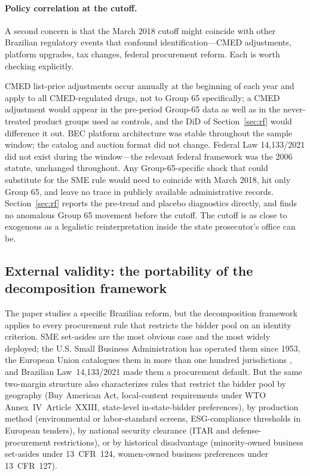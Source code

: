 \paragraph{Policy correlation at the cutoff.} A second concern is that the March 2018 cutoff might coincide with other Brazilian regulatory events that confound identification---CMED adjustments, platform upgrades, tax changes, federal procurement reform. Each is worth checking explicitly.

CMED list-price adjustments occur annually at the beginning of each year and apply to all CMED-regulated drugs, not to Group 65 specifically; a CMED adjustment would appear in the pre-period Group-65 data as well as in the never-treated product groups used as controls, and the DiD of Section~\ref{sec:rf} would difference it out. BEC platform architecture was stable throughout the sample window; the catalog and auction format did not change. Federal Law 14{,}133/2021 did not exist during the window---the relevant federal framework was the 2006 statute, unchanged throughout. Any Group-65-specific shock that could substitute for the SME rule would need to coincide with March 2018, hit only Group 65, and leave no trace in publicly available administrative records. Section~\ref{sec:rf} reports the pre-trend and placebo diagnostics directly, and finds no anomalous Group 65 movement before the cutoff. The cutoff is as close to exogenous as a legalistic reinterpretation inside the state prosecutor's office can be.

\subsection{External validity: the portability of the decomposition framework}\label{sec:external}

The paper studies a specific Brazilian reform, but the decomposition framework applies to every procurement rule that restricts the bidder pool on an identity criterion. SME set-asides are the most obvious case and the most widely deployed; the U.S. Small Business Administration has operated them since 1953, the European Union catalogues them in more than one hundred jurisdictions \citep{bosio2022}, and Brazilian Law~14{,}133/2021 made them a procurement default. But the same two-margin structure also characterizes rules that restrict the bidder pool by geography (Buy American Act, local-content requirements under WTO Annex~IV~Article~XXIII, state-level in-state-bidder preferences), by production method (environmental or labor-standard screens, ESG-compliance thresholds in European tenders), by national security clearance (ITAR and defense-procurement restrictions), or by historical disadvantage (minority-owned business set-asides under 13~CFR~124, women-owned business preferences under 13~CFR~127).

